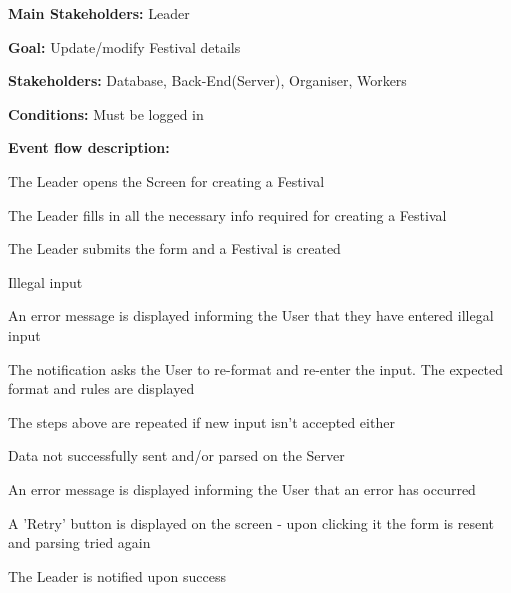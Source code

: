 				\noindent {}
				\begin{packed_item}
					\item \textbf{Main Stakeholders:} Leader
					\item \textbf{Goal:} Update/modify Festival details
					\item \textbf{Stakeholders: } Database, Back-End(Server), Organiser, Workers
					\item \textbf{Conditions: } Must be logged in
					\item \textbf{Event flow description: }
					\begin{packed_enum}
						\item The Leader opens the Screen for creating a Festival
						\item The Leader fills in all the necessary info required for creating a Festival
						\item The Leader submits the form and a Festival is created
					\end{packed_enum}
					
					\begin{packed_item}
						\item[2.a] Illegal input
						\item[] \begin{packed_enum}
							\item An error message is displayed informing the User that they have entered illegal input
							\item The notification asks the User to re-format and re-enter the input. The expected format and rules are displayed
							\item The steps above are repeated if new input isn't accepted either
						\end{packed_enum}
						
						\item[3.a] Data not successfully sent and/or parsed on the Server
						\item[] \begin{packed_enum}
							\item An error message is displayed informing the User that an error has occurred
							\item A 'Retry' button is displayed on the screen - upon clicking it the form is resent and parsing tried again
							\item The Leader is notified upon success
						\end{packed_enum}
						
					\end{packed_item}
				\end{packed_item}
			
